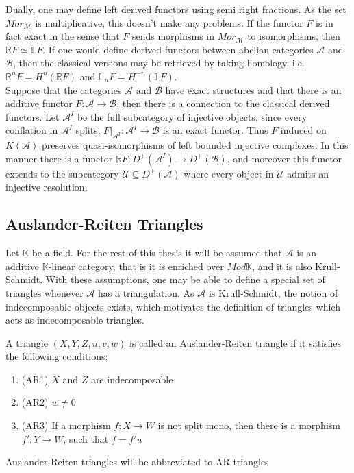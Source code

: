         Dually, one may define left derived functors using semi right fractions. As the set $Mor_{\mathcal{M}}$ is multiplicative, this doesn't make any problems. If the functor $F$ is in fact exact in the sense that $F$ sends morphisms in $Mor_{\mathcal{M}}$ to isomorphisms, then $\mathbb{R}F \simeq \mathbb{L}F$. If one would define derived functors between abelian categories $\mathcal{A}$ and $\mathcal{B}$, then the classical versions may be retrieved by taking homology, i.e. $\mathbb{R}^nF = H^n(\mathbb{R}F)$ and $\mathbb{L}_nF = H^{-n}(\mathbb{L}F)$. \\
        
        Suppose that the categories $\mathcal{A}$ and $\mathcal{B}$ have exact structures and that there is an additive functor $F:\mathcal{A}\rightarrow \mathcal{B}$, then there is a connection to the classical derived functors. Let $\mathcal{A}^I$ be the full subcategory of injective objects, since every conflation in $\mathcal{A}^I$ splits, $F|_{\mathcal{A}^{I}}:\mathcal{A}^I\rightarrow \mathcal{B}$ is an exact functor. Thus $F$ induced on $K(\mathcal{A})$ preserves quasi-isomorphisms of left bounded injective complexes. In this manner there is a functor $\mathbb{R}F:D^+(\mathcal{A}^I)\rightarrow D^+(\mathcal{B})$, and moreover this functor extends to the subcategory $\mathcal{U}\subseteq D^+(\mathcal{A})$ where every object in $\mathcal{U}$ admits an injective resolution. \\

    \subsection{Auslander-Reiten Triangles}

        Let $\mathbb{K}$ be a field. For the rest of this thesis it will be assumed that $\mathcal{A}$ is an additive $\mathbb{K}$-linear category, that is it is enriched over $Mod \mathbb{K}$, and it is also Krull-Schmidt. With these assumptions, one may be able to define a special set of triangles whenever $\mathcal{A}$ has a triangulation. As $\mathcal{A}$ is Krull-Schmidt, the notion of indecomposable objects exists, which motivates the definition of triangles which acts as indecomposable triangles.

        \begin{definition}
            A triangle $(X,Y,Z,u,v,w)$ is called an Auslander-Reiten triangle if it satisfies the following conditions:
            \begin{enumerate}
                \item (AR1) $X$ and $Z$ are indecomposable
                \item (AR2) $w\neq 0$
                \item (AR3) If a morphism $f:X\rightarrow W$ is not split mono, then there is a morphism $f':Y\rightarrow W$, such that $f=f'u$
            \end{enumerate}
            Auslander-Reiten triangles will be abbreviated to AR-triangles
        \end{definition}

